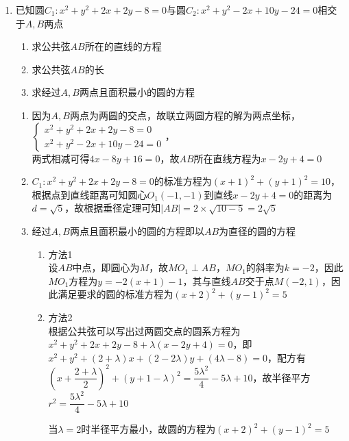 \begin{enumerate}
\begin{enumerate}
\begin{jieda}
        \end{jieda}
        \item 已知圆$C_1: x^2+y^2+2x+2y-8=0$与圆$C_2: x^2+y^2-2x+10y-24 = 0$相交于$A, B$两点
        \begin{enumerate}
            \item 求公共弦$AB$所在的直线的方程
            \item 求公共弦$AB$的长
            \item 求经过$A, B$两点且面积最小的圆的方程
        \end{enumerate}
        \begin{jieda}
            \begin{enumerate}
                \item 因为$A, B$两点为两圆的交点，故联立两圆方程的解为两点坐标，\\
                $\left\{\begin{array}{l}
                x^2+y^2+2x+2y-8=0 \\
                x^2+y^2-2x+10y-24 = 0
                \end{array}\right.$，\\
                两式相减可得$4x-8y+16=0$，故$AB$所在直线方程为$x-2y+4=0$
                \item $C_1: x^2+y^2+2x+2y-8=0$的标准方程为$(x+1)^2+(y+1)^2 = 10$，根据点到直线距离可知圆心$O_1(-1, -1)$到直线$x-2y+4=0$的距离为$d = \sqrt{5}$，故根据垂径定理可知$|AB| = 2\times \sqrt{10-5} = 2\sqrt{5}$
                \item 经过$A, B$两点且面积最小的圆的方程即以$AB$为直径的圆的方程
                \begin{enumerate}
                    \item 方法1 \\
                    设$AB$中点，即圆心为$M$，故$MO_1 \perp AB$，$MO_1$的斜率为$k = -2$，因此$MO_1$方程为$y = -2(x+1)-1$，其与直线$AB$交于点$M(-2, 1)$，因此满足要求的圆的标准方程为$(x+2)^2+(y-1)^2 = 5$
                    \item 方法2 \\
                    根据公共弦可以写出过两圆交点的圆系方程为$x^2+y^2+2x+2y-8+\lambda(x-2y+4)=0$，即$x^2 + y^2+(2+\lambda)x+(2-2\lambda)y+(4\lambda-8) = 0$，配方有${\left( x + \dfrac{2 + \lambda }{2}\right) }^{2} + {\left( y + 1 - \lambda \right) }^{2} = \dfrac{5{\lambda }^{2}}{4} - {5\lambda } +10$，故半径平方$r^2 = \dfrac{5{\lambda }^{2}}{4} - {5\lambda } +10$

                    当$\lambda = 2$时半径平方最小，故圆的方程为$(x+2)^2+(y-1)^2 = 5$
                \end{enumerate}
                

\end{enumerate}
\end{jieda}
\end{enumerate}
\end{enumerate}
